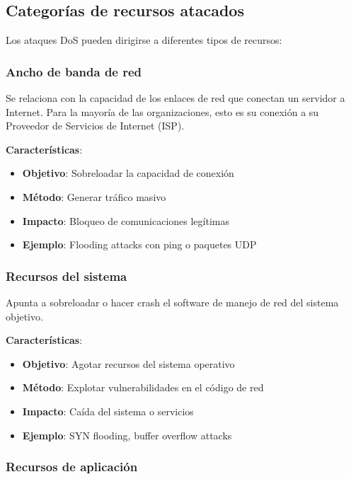 \subsection{Categorías de recursos atacados}

Los ataques DoS pueden dirigirse a diferentes tipos de recursos:

\subsubsection{Ancho de banda de red}

Se relaciona con la capacidad de los enlaces de red que conectan un servidor a Internet. Para la mayoría de las organizaciones, esto es su conexión a su Proveedor de Servicios de Internet (ISP).

\textbf{Características}:
\begin{itemize}
    \item \textbf{Objetivo}: Sobreloadar la capacidad de conexión
    \item \textbf{Método}: Generar tráfico masivo
    \item \textbf{Impacto}: Bloqueo de comunicaciones legítimas
    \item \textbf{Ejemplo}: Flooding attacks con ping o paquetes UDP
\end{itemize}

\subsubsection{Recursos del sistema}

Apunta a sobreloadar o hacer crash el software de manejo de red del sistema objetivo.

\textbf{Características}:
\begin{itemize}
    \item \textbf{Objetivo}: Agotar recursos del sistema operativo
    \item \textbf{Método}: Explotar vulnerabilidades en el código de red
    \item \textbf{Impacto}: Caída del sistema o servicios
    \item \textbf{Ejemplo}: SYN flooding, buffer overflow attacks
\end{itemize}

\subsubsection{Recursos de aplicación}

